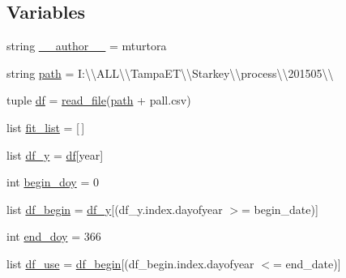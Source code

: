 \subsection*{Variables}
\begin{DoxyCompactItemize}
\item 
string \hyperlink{namespaceoptimum__growing__season_ae41ec55f6e12d36d800ecea02431a361}{\+\_\+\+\_\+author\+\_\+\+\_\+} = \textquotesingle{}mturtora\textquotesingle{}
\item 
string \hyperlink{namespaceoptimum__growing__season_a8ff964a02946ca58f934b298b97d02a5}{path} = \textquotesingle{}I\+:\textbackslash{}\textbackslash{}\+A\+L\+L\textbackslash{}\textbackslash{}\+Tampa\+E\+T\textbackslash{}\textbackslash{}\+Starkey\textbackslash{}\textbackslash{}process\textbackslash{}\textbackslash{}201505\textbackslash{}\textbackslash{}\textquotesingle{}
\item 
tuple \hyperlink{namespaceoptimum__growing__season_a14764e801d085f0fee6374df984ca31a}{df} = \hyperlink{namespaceoptimum__growing__season_a39480590780518ff82e7c259a8154086}{read\+\_\+file}(\hyperlink{namespaceoptimum__growing__season_a8ff964a02946ca58f934b298b97d02a5}{path} + \textquotesingle{}pall.\+csv\textquotesingle{})
\item 
list \hyperlink{namespaceoptimum__growing__season_a85ef5ae3b7aeaa6d70cb52733a03aedf}{fit\+\_\+list} = \mbox{[}$\,$\mbox{]}
\item 
list \hyperlink{namespaceoptimum__growing__season_a3a6ea20f80fd3051ababd80bd44be590}{df\+\_\+y} = \hyperlink{namespaceoptimum__growing__season_a14764e801d085f0fee6374df984ca31a}{df}\mbox{[}year\mbox{]}
\item 
int \hyperlink{namespaceoptimum__growing__season_a7db52c7f8bf69d14f4351de1d63a6c88}{begin\+\_\+doy} = 0
\item 
list \hyperlink{namespaceoptimum__growing__season_ac483918c3a7aebac572b6cd2f40f8177}{df\+\_\+begin} = \hyperlink{namespaceoptimum__growing__season_a3a6ea20f80fd3051ababd80bd44be590}{df\+\_\+y}\mbox{[}(df\+\_\+y.\+index.\+dayofyear $>$= begin\+\_\+date)\mbox{]}
\item 
int \hyperlink{namespaceoptimum__growing__season_a14929bfec491de189c1e0e536710facd}{end\+\_\+doy} = 366
\item 
list \hyperlink{namespaceoptimum__growing__season_a482c39a2eb8f7c0c781089e4e04cabc6}{df\+\_\+use} = \hyperlink{namespaceoptimum__growing__season_ac483918c3a7aebac572b6cd2f40f8177}{df\+\_\+begin}\mbox{[}(df\+\_\+begin.\+index.\+dayofyear $<$= end\+\_\+date)\mbox{]}
\item 

\end{DoxyCompactItemize}
